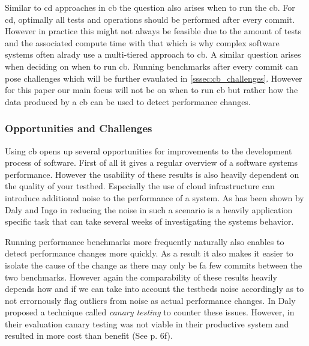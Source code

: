 \documentclass[	runningheads,
				a4paper]{llncs}
\begin{document}
	Similar to \gls{cd} approaches in \gls{cb} the question also arises when to run the \gls{cb}. For \gls{cd}, optimally all tests and operations should be performed after every commit. However in practice this might not always be feasible due to the amount of tests and the associated compute time with that which is why complex software systems often alrady use a multi-tiered approach to \gls{cb}. A similar question arises when deciding on when to run \gls{cb}. Running benchmarks after every commit can pose challenges which will be further evaulated in \autoref{sssec:cb_challenges}. However for this paper our main focus will not be on when to run \gls{cb} but rather how the data produced by a \gls{cb} can be used to detect performance changes.

		\subsubsection{Opportunities and Challenges}

		Using \gls{cb} opens up several opportunities for improvements to the development process of software. First of all it gives a regular overview of a software systems performance. However the usability of these results is also heavily dependent on the quality of your testbed. Especially the use of cloud infrastructure can introduce additional noise to the performance of a system. As has been shown by Daly and Ingo in \cite{daly2019} reducing the noise in such a scenario is a heavily application specific task that can take several weeks of investigating the systems behavior.

	Running performance benchmarks more frequently naturally also enables to detect performance changes more quickly. As a result it also makes it easier to isolate the cause of the change as there may only be fa few commits between the two benchmarks. However again the comparability of these results heavily depends how and if we can take into account the testbeds noise accordingly as to not errornously flag outliers from noise as actual performance changes. In \cite{daly2021} Daly proposed a technique called \textit{canary testing} to counter these issues. However, in their evaluation canary testing was not viable in their productive system and resulted in more cost than benefit (See \cite{daly2021} p. 6f).
\end{document}
